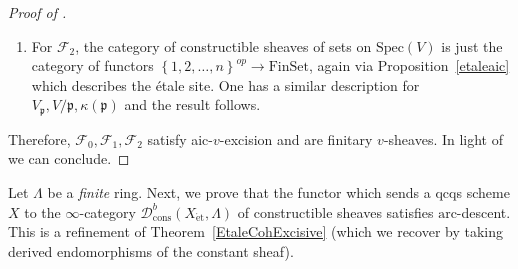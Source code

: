 \documentclass[reqno]{amsart}
\newcommand{\sF}{\mathcal{F}}
\newcommand{\spec}{\mathrm{Spec}}
\newcommand{\et}{\mathrm{\acute{e}t}}
\newcommand{\arc}{\mathrm{arc}}
\newcommand{\D}{\mathcal{D}}
\theoremstyle{definition}
\begin{document}
\begin{proof}[Proof of ]
\begin{enumerate}
We need to see 
that $\sF_0( \spec(V)) \simeq \sF_0( \spec(V_{\mathfrak{p}}))
\times_{ \sF_0( \spec( \kappa( \mathfrak{p})))} \sF_0( \spec( V/\mathfrak{p}))$. 
We can reduce to the case where $V$ has finite rank by writing
$V$ as a filtered colimit of absolutely integrally closed valuation subrings
(Lemma~\ref{filtcolimitaic}).  Suppose $V$ has rank $n$, so 
$\spec(V)$ is the totally ordered set $\left\{1,2, \dots, n\right\}$ under
specialization, and
$\mathfrak{p}$ corresponds to the element $i \in [1, n]$. 
Then we observe that: 
\begin{enumerate}
\item The category of 
quasi-compact separated \'etale $V$-schemes is the category of functors $(1 \to 2 \to \dots
\to n)^{op} \to \mathrm{FinSet}_{\mathrm{inj}}$, the category of finite sets and
injections. 
\item The category of 
quasi-compact
separated \'etale $V_{\mathfrak{p}}$-schemes is the
category of functors $(1\to 2 \to \dots \to i)^{op} \to
\mathrm{FinSet}_{\mathrm{inj}}$. 
\item 
The category of 
quasi-compact
separated \'etale $(V/\mathfrak{p})$-schemes is the
category of functors $(i\to i+1 \to \dots \to n)^{op} \to
\mathrm{FinSet}_{\mathrm{inj}}$. 
\item The category of 
quasi-compact
separated \'etale $\kappa( \mathfrak{p})$-schemes 
is the category of functors $i^{op} \to \mathrm{FinSet}_{\mathrm{inj}}$. 
\end{enumerate}

In view of the above identifications,  
$\sF_0( \spec(V)) \simeq \sF_0( \spec(V_{\mathfrak{p}}))
\times_{ \sF_0( \spec( \kappa( \mathfrak{p})))} \sF_0( \spec( V/\mathfrak{p}))$
as desired. 
\item For $\sF_2$, the category of constructible sheaves of sets on $\spec(V)$
is just the category of functors $\left\{1, 2, \dots, n\right\}^{op} \to \mathrm{FinSet}$, again
via Proposition~\ref{etaleaic} which describes the \'etale site. 
One has a similar description for $V_{\mathfrak{p}}, V/\mathfrak{p}, \kappa(\mathfrak{p})$ and the
result follows. 
\end{enumerate}
Therefore, $\sF_0, \sF_1, \sF_2$ satisfy aic-$v$-excision and are finitary $v$-sheaves. 
In light of  we can conclude. 
\end{proof} 

 
Let $\Lambda$ be a \emph{finite} ring. 
Next, we prove that the functor which sends a qcqs scheme $X$ to the
$\infty$-category $\D^b_{\mathrm{cons}}(X_{\et}, \Lambda)$ of constructible sheaves 
satisfies $\arc$-descent. This is a refinement of
Theorem~\ref{EtaleCohExcisive} (which we recover by taking derived endomorphisms of the
constant sheaf).
\end{document}
